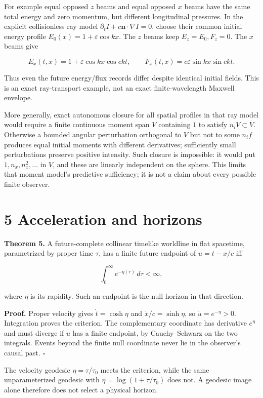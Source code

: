 \documentclass[
  11pt,
  a4paper,
]{article}
\begin{document}
For example equal opposed \(z\) beams and equal opposed \(x\) beams have the same total energy and zero momentum, but different longitudinal pressures. In the explicit collisionless ray model \(\partial_tI+c\mathbf n\cdot\nabla I=0\), choose their common initial energy profile \(E_0(x)=1+\varepsilon\cos kx\). The \(z\) beams keep \(E_z=E_0,F_z=0\). The \(x\) beams give

\[E_x(t,x)=1+\varepsilon\cos kx\cos ckt,\qquad
F_x(t,x)=c\varepsilon\sin kx\sin ckt.\]

Thus even the future energy/flux records differ despite identical initial fields. This is an exact ray-transport example, not an exact finite-wavelength Maxwell envelope.

More generally, exact autonomous closure for all spatial profiles in that ray model would require a finite continuous moment span \(V\) containing \(1\) to satisfy \(n_iV\subset V\). Otherwise a bounded angular perturbation orthogonal to \(V\) but not to some \(n_if\) produces equal initial moments with different derivatives; sufficiently small perturbations preserve positive intensity. Such closure is impossible: it would put \(1,n_x,n_x^2,\ldots\) in \(V\), and these are linearly independent on the sphere. This limits that moment model's predictive sufficiency; it is not a claim about every possible finite observer.

\section{5 Acceleration and horizons}\label{acceleration-and-horizons}

\textbf{Theorem 5.} A future-complete collinear timelike worldline in flat spacetime, parametrized by proper time \(\tau\), has a finite future endpoint of \(u=t-x/c\) iff

\[\int_0^\infty e^{-\eta(\tau)}\,d\tau<\infty,\]

where \(\eta\) is its rapidity. Such an endpoint is the null horizon in that direction.

\textbf{Proof.} Proper velocity gives \(\dot t=\cosh\eta\) and \(\dot x/c=\sinh\eta\), so \(\dot u=e^{-\eta}>0\). Integration proves the criterion. The complementary coordinate has derivative \(e^\eta\) and must diverge if \(u\) has a finite endpoint, by Cauchy--Schwarz on the two integrals. Events beyond the finite null coordinate never lie in the observer's causal past. \(\square\)

The velocity geodesic \(\eta=\tau/\tau_0\) meets the criterion, while the same unparameterized geodesic with \(\eta=\log(1+\tau/\tau_0)\) does not. A geodesic image alone therefore does not select a physical horizon.
\end{document}
